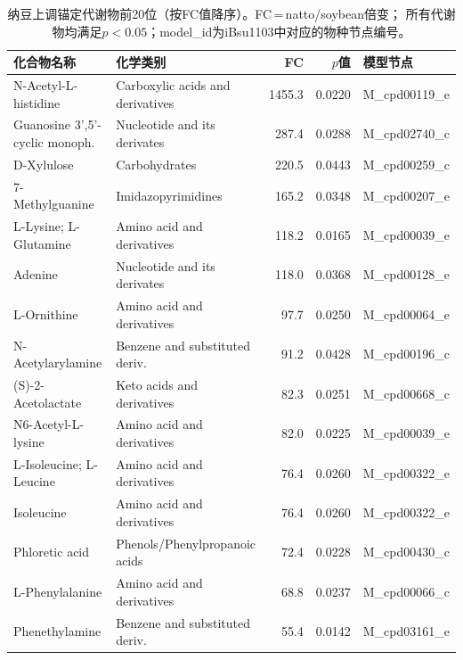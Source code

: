 \documentclass[10pt, a4paper, twocolumn]{ctexart}
\begin{document}
\begin{table}[htbp]
\caption{纳豆上调锚定代谢物前20位（按FC值降序）。FC\,=\,natto/soybean倍变；
  所有代谢物均满足$p<0.05$；model\_id为iBsu1103中对应的物种节点编号。}
\label{tab:natto_up}
\small
\begin{tabularx}{\textwidth}{lXrrp{3.0cm}}
\toprule
\textbf{化合物名称} & \textbf{化学类别} & \textbf{FC} & \textbf{$p$值} & \textbf{模型节点} \\
\midrule
N-Acetyl-L-histidine          & Carboxylic acids and derivatives & 1455.3 & 0.0220 & M\_cpd00119\_e \\
Guanosine 3',5'-cyclic monoph.& Nucleotide and its derivates     &  287.4 & 0.0288 & M\_cpd02740\_c \\
D-Xylulose                    & Carbohydrates                    &  220.5 & 0.0443 & M\_cpd00259\_c \\
7-Methylguanine               & Imidazopyrimidines               &  165.2 & 0.0348 & M\_cpd00207\_e \\
L-Lysine; L-Glutamine         & Amino acid and derivatives       &  118.2 & 0.0165 & M\_cpd00039\_e \\
Adenine                       & Nucleotide and its derivates     &  118.0 & 0.0368 & M\_cpd00128\_e \\
L-Ornithine                   & Amino acid and derivatives       &   97.7 & 0.0250 & M\_cpd00064\_e \\
N-Acetylarylamine             & Benzene and substituted deriv.   &   91.2 & 0.0428 & M\_cpd00196\_c \\
(S)-2-Acetolactate            & Keto acids and derivatives       &   82.3 & 0.0251 & M\_cpd00668\_c \\
N6-Acetyl-L-lysine            & Amino acid and derivatives       &   82.0 & 0.0225 & M\_cpd00039\_e \\
L-Isoleucine; L-Leucine       & Amino acid and derivatives       &   76.4 & 0.0260 & M\_cpd00322\_e \\
Isoleucine                    & Amino acid and derivatives       &   76.4 & 0.0260 & M\_cpd00322\_e \\
Phloretic acid                & Phenols/Phenylpropanoic acids    &   72.4 & 0.0228 & M\_cpd00430\_c \\
L-Phenylalanine               & Amino acid and derivatives       &   68.8 & 0.0237 & M\_cpd00066\_c \\
Phenethylamine                & Benzene and substituted deriv.   &   55.4 & 0.0142 & M\_cpd03161\_e \\

\end{tabularx}
\end{table}
\end{document}
